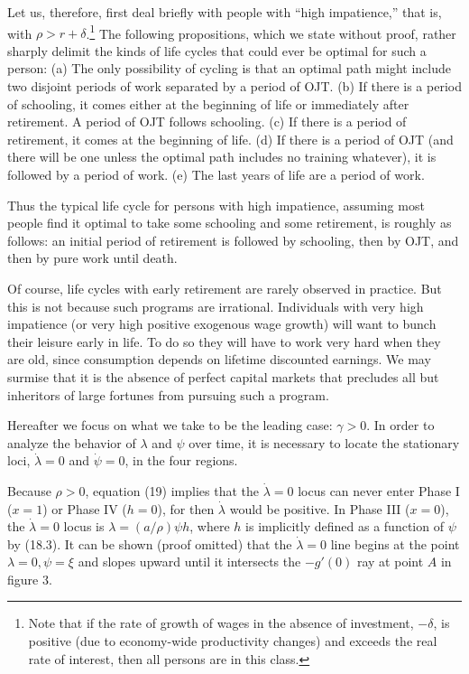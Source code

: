 \documentclass[11pt,fleqn]{article}
\begin{document}
Let us, therefore, first deal briefly with people with ``high impatience,'' that is, with $\rho > r + \delta$.\footnote{Note that if the rate of growth of wages in the absence of investment, $-\delta$, is positive (due to economy-wide productivity changes) and exceeds the real rate of interest, then all persons are in this class.} The following propositions, which we state without proof, rather sharply delimit the kinds of life cycles that could ever be optimal for such a person: (a) The only possibility of cycling is that an optimal path might include two disjoint periods of work separated by a period of OJT. (b) If there is a period of schooling, it comes either at the beginning of life or immediately after retirement. A period of OJT follows schooling. (c) If there is a period of retirement, it comes at the beginning of life. (d) If there is a period of OJT (and there will be one unless the optimal path includes no training whatever), it is followed by a period of work. (e) The last years of life are a period of work.

Thus the typical life cycle for persons with high impatience, assuming most people find it optimal to take some schooling and some retirement, is roughly as follows: an initial period of retirement is followed by schooling, then by OJT, and then by pure work until death.

Of course, life cycles with early retirement are rarely observed in practice. But this is not because such programs are irrational. Individuals with very high impatience (or very high positive exogenous wage growth) will want to bunch their leisure early in life. To do so they will have to work very hard when they are old, since consumption depends on lifetime discounted earnings. We may surmise that it is the absence of perfect capital markets that precludes all but inheritors of large fortunes from pursuing such a program.

Hereafter we focus on what we take to be the leading case: $\gamma > 0$. In order to analyze the behavior of $\lambda$ and $\psi$ over time, it is necessary to locate the stationary loci, $\dot{\lambda} = 0$ and $\dot{\psi} = 0$, in the four regions.

Because $\rho > 0$, equation (19) implies that the $\dot{\lambda} = 0$ locus can never enter Phase I ($x = 1$) or Phase IV ($h = 0$), for then $\dot{\lambda}$ would be positive. In Phase III ($x = 0$), the $\dot{\lambda} = 0$ locus is $\lambda = (a/\rho)\psi h$, where $h$ is implicitly defined as a function of $\psi$ by (18.3). It can be shown (proof omitted) that the $\dot{\lambda} = 0$ line begins at the point $\lambda = 0, \psi = \xi$ and slopes upward until it intersects the $-g'(0)$ ray at point $A$ in figure 3.
\end{document}
